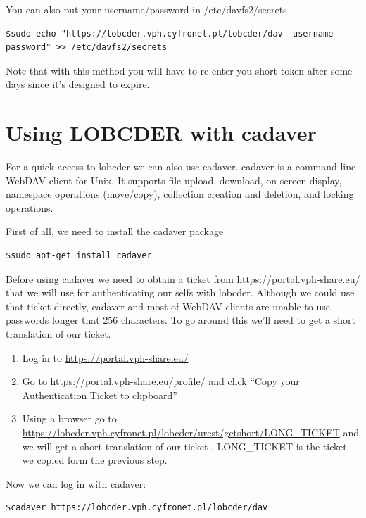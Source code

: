 \documentclass[a4paper,10pt]{report}
\begin{document}
You can also put your username/password in /etc/davfs2/secrets

\begin{lstlisting}
$sudo echo "https://lobcder.vph.cyfronet.pl/lobcder/dav  username  password" >> /etc/davfs2/secrets
\end{lstlisting}


Note that with this method you will have to re-enter you short token after some days since it's designed to expire.  




\section{Using LOBCDER with cadaver}
For a quick access to lobcder we can also use cadaver. cadaver is a command-line WebDAV client for Unix. It supports file upload, download, on-screen display, namespace operations (move/copy), collection creation and deletion, and locking operations.

First of all, we need to install the cadaver package

\begin{lstlisting}
$sudo apt-get install cadaver
\end{lstlisting}



Before using cadaver we need to obtain a ticket from \url{https://portal.vph-share.eu/} that we will use for authenticating our selfs with lobcder. Although we could use that ticket directly, cadaver and most of WebDAV clients are unable to use passwords longer that 256 characters. To go around this we'll need to get a short translation of our ticket.


\begin{enumerate}
 \item Log in to \url{https://portal.vph-share.eu/}
 \item Go to \url{https://portal.vph-share.eu/profile/} and click ``Copy your Authentication Ticket to clipboard''
 \item Using a browser go to \url{https://lobcder.vph.cyfronet.pl/lobcder/urest/getshort/LONG\_TICKET} and we will get a short translation of our ticket . LONG\_TICKET is the ticket we copied form the previous step.
\end{enumerate}

Now we can log in with cadaver:

\begin{lstlisting}
$cadaver https://lobcder.vph.cyfronet.pl/lobcder/dav
\end{lstlisting}
\end{document}
